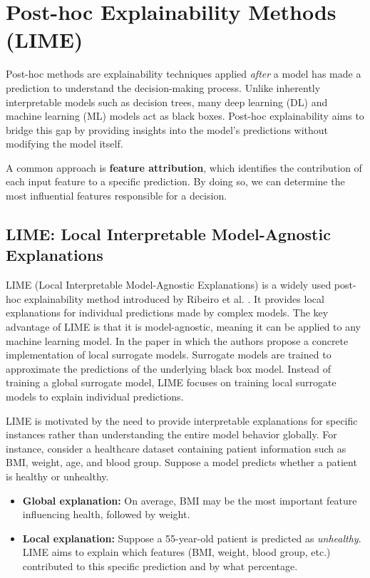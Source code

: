 \section{Post-hoc Explainability Methods (LIME)}

Post-hoc methods are explainability techniques applied \textit{after} a model has made a prediction to understand the decision-making process. Unlike inherently interpretable models such as decision trees, many deep learning (DL) and machine learning (ML) models act as black boxes. Post-hoc explainability aims to bridge this gap by providing insights into the model’s predictions without modifying the model itself.

A common approach is \textbf{feature attribution}, which identifies the contribution of each input feature to a specific prediction. By doing so, we can determine the most influential features responsible for a decision.

\subsection{LIME: Local Interpretable Model-Agnostic Explanations}

LIME (Local Interpretable Model-Agnostic Explanations) is a widely used post-hoc explainability method introduced by Ribeiro et al. \cite{ribeiro2016ML}. It provides local explanations for individual predictions made by complex models. The key advantage of LIME is that it is model-agnostic, meaning it can be applied to any machine learning model. In the paper \cite{ribeiro2016ML} in which the authors propose a concrete implementation of local surrogate models. Surrogate models are trained to approximate the predictions of the underlying black box model. Instead of training a global surrogate model, LIME focuses on training local surrogate models to explain individual predictions.

LIME is motivated by the need to provide interpretable explanations for specific instances rather than understanding the entire model behavior globally. For instance, consider a healthcare dataset containing patient information such as BMI, weight, age, and blood group. Suppose a model predicts whether a patient is healthy or unhealthy. 

\begin{itemize}
    \item \textbf{Global explanation:} On average, BMI may be the most important feature influencing health, followed by weight.
    \item \textbf{Local explanation:} Suppose a 55-year-old patient is predicted as \textit{unhealthy}. LIME aims to explain which features (BMI, weight, blood group, etc.) contributed to this specific prediction and by what percentage.
\end{itemize}

